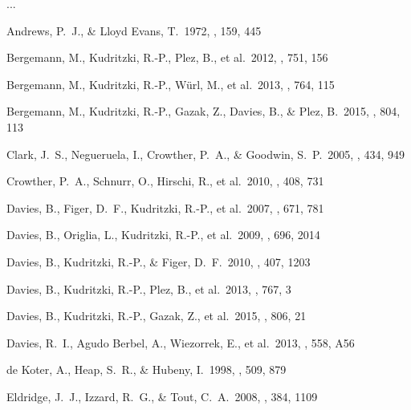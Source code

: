\documentclass[useAMS,usenatbib]{mn2e}
\begin{document}
...

% 

\begin{thebibliography}{99}

 Andrews, P.~J., \& Lloyd Evans, T.\ 1972, \mnras, 159, 445

 Bergemann, M.,
Kudritzki, R.-P., Plez, B., et al.\ 2012, \apj, 751, 156

 Bergemann, M.,
Kudritzki, R.-P., W{\"u}rl, M., et al.\ 2013, \apj, 764, 115

 Bergemann, M.,
Kudritzki, R.-P., Gazak, Z., Davies, B., \& Plez, B.\ 2015, \apj, 804, 113

 Clark, J.~S., Negueruela, I., Crowther, P.~A., \& Goodwin, S.~P.\ 2005, \aap, 434, 949

 Crowther, P.~A.,
Schnurr, O., Hirschi, R., et al.\ 2010, \mnras, 408, 731

 Davies, B., Figer,
D.~F., Kudritzki, R.-P., et al.\ 2007, \apj, 671, 781

 Davies, B., Origlia, L.,
Kudritzki, R.-P., et al.\ 2009, \apj, 696, 2014

 Davies, B., Kudritzki,
R.-P., \& Figer, D.~F.\ 2010, \mnras, 407, 1203

 Davies, B., Kudritzki,
R.-P., Plez, B., et al.\ 2013, \apj, 767, 3

 Davies, B., Kudritzki,
R.-P., Gazak, Z., et al.\ 2015, \apj, 806, 21

 Davies, R.~I., Agudo Berbel, A., Wiezorrek, E., et al.\ 2013, \aap, 558, A56

 de Koter, A., Heap,
S.~R., \& Hubeny, I.\ 1998, \apj, 509, 879

 Eldridge, J.~J.,
Izzard, R.~G., \& Tout, C.~A.\ 2008, \mnras, 384, 1109


\end{thebibliography}
\end{document}

